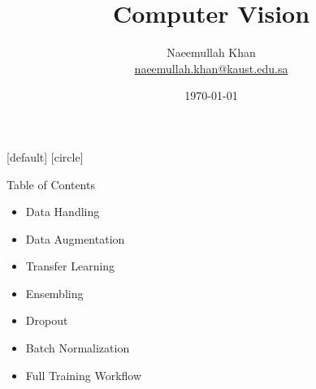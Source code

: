 \documentclass[10pt]{beamer}
\title[Computer Vision]{Computer Vision}
\theoremstyle{remark}
\theoremstyle{definition}
\begin{document}
\author[KAUST Academy]{
	\begin{tabular}{c} 
	\Large
	Naeemullah Khan\\
    \footnotesize \href{mailto:naeemullah.khan@kaust.edu.sa}{naeemullah.khan@kaust.edu.sa}
\end{tabular}
\vspace{-4ex}}


\date{\today}

\begin{noheadline}
\begin{frame}\maketitle\end{frame}
\end{noheadline}


[default]
[circle]

\begin{frame}{Table of Contents}
\begin{itemize}
    \item Data Handling
    \item Data Augmentation
    \item Transfer Learning
    \item Ensembling
    \item Dropout
    \item Batch Normalization
    \item Full Training Workflow
\end{itemize}
    
\end{frame}
\end{document}
